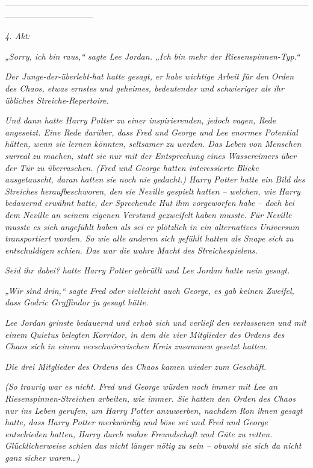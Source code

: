 {--------------------------------------------------------------------------------------------------------------------------------------------

\emph{4. Akt:}

\emph{„Sorry, ich bin raus,“ sagte Lee Jordan. „Ich bin mehr der Riesenspinnen-Typ.“}

\emph{Der Junge-der-überlebt-hat hatte gesagt, er habe} \emph{\emph{wichtige}} \emph{Arbeit für den} \emph{Orden des Chaos, etwas ernstes und geheimes, bedeutender und schwieriger als ihr übliches Streiche-Repertoire.}

\emph{Und dann hatte Harry Potter zu einer inspirierenden, jedoch vagen, Rede angesetzt. Eine Rede darüber, dass Fred und George und Lee enormes Potential hätten, wenn sie lernen könnten,} \emph{\emph{seltsamer}} \emph{zu werden. Das Leben von Menschen} \emph{\emph{surreal}} \emph{zu machen, statt sie nur mit der Entsprechung} \emph{eines} \emph{Wassereimers} \emph{über} \emph{der} \emph{Tür zu überraschen. (Fred und George hatten interessierte Blicke ausgetauscht, daran hatten sie noch nie gedacht.) Harry Potter hatte ein Bild des} \emph{Streiches} \emph{heraufbeschworen, den sie Neville gespielt hatten --} \emph{welchen, wie Harry bedauernd erwähnt hatte, der Sprechende Hut ihm vorgeworfen habe -- doch bei dem Neville} \emph{\emph{an seinem eigenen Verstand gezweifelt}} \emph{haben musste. Für Neville musste es sich angefühlt haben als sei er plötzlich in ein alternatives Universum transportiert worden. So wie alle anderen sich gefühlt hatten als Snape sich zu entschuldigen schien. Das war die} \emph{\emph{wahre Macht des Streichespielens.}}

\emph{\emph{Seid ihr dabei?}} \emph{hatte Harry Potter gebrüllt und Lee Jordan hatte nein gesagt.}

\emph{„Wir sind} \emph{\emph{drin,}“ sagte Fred oder vielleicht auch George, es gab keinen Zweifel, dass Godric Gryffindor ja gesagt hätte.}

\emph{Lee Jordan grinste bedauernd und erhob sich und verließ den verlassenen und mit einem Quietus belegten Korridor, in dem die vier Mitglieder des Ordens des Chaos sich in einem verschwörerischen Kreis zusammen gesetzt hatten.}

\emph{Die drei Mitglieder des Ordens des Chaos kamen wieder zum Geschäft.}

\emph{(\emph{So}} \emph{traurig war es nicht. Fred und George würden noch immer mit Lee an Riesenspinnen-Streichen arbeiten, wie immer. Sie hatten den Orden des Chaos nur ins Leben gerufen, um Harry Potter anzuwerben, nachdem Ron ihnen gesagt hatte, dass Harry Potter merkwürdig und böse sei und Fred und George entschieden hatten, Harry durch wahre Freundschaft und Güte zu retten. Glücklicherweise schien das nicht länger nötig zu sein -- obwohl sie sich da nicht} \emph{\emph{ganz}} \emph{sicher waren…)}

}
